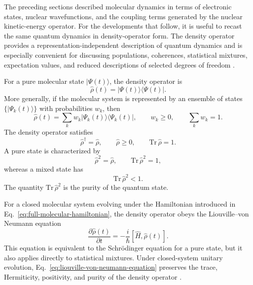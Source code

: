 \documentclass[
  11pt,
  letterpaper,
  onehalfspacing,
  normalmargins,
  equalmargins,
  oneside
]{ut-thesis}
\begin{document}
The preceding sections described molecular dynamics in terms of electronic
states, nuclear wavefunctions, and the coupling terms generated by the nuclear
kinetic-energy operator. For the developments that follow, it is useful to
recast the same quantum dynamics in density-operator form. The density operator
provides a representation-independent description of quantum dynamics and is
especially convenient for discussing populations, coherences, statistical
mixtures, expectation values, and reduced descriptions of selected degrees of
freedom \cite{vonNeumann1955,Blum2012}.

For a pure molecular state \(|\Psi(t)\rangle\), the density operator is
\begin{equation}
\hat\rho(t)
=
|\Psi(t)\rangle\langle\Psi(t)|.
\label{eq:pure-state-density-operator}
\end{equation}
More generally, if the molecular system is represented by an ensemble of states
\(\{|\Psi_k(t)\rangle\}\) with probabilities \(w_k\), then
\begin{equation}
\hat\rho(t)
=
\sum_k
w_k
|\Psi_k(t)\rangle\langle\Psi_k(t)|,
\qquad
w_k\geq 0,
\qquad
\sum_k w_k=1 .
\label{eq:mixed-state-density-operator}
\end{equation}
The density operator satisfies
\begin{equation}
\hat\rho^\dagger=\hat\rho,
\qquad
\hat\rho\geq 0,
\qquad
\mathrm{Tr}\,\hat\rho=1.
\label{eq:density-operator-basic-properties}
\end{equation}
A pure state is characterized by
\begin{equation}
\hat\rho^2=\hat\rho,
\qquad
\mathrm{Tr}\,\hat\rho^2=1,
\label{eq:pure-state-density-properties}
\end{equation}
whereas a mixed state has
\begin{equation}
\mathrm{Tr}\,\hat\rho^2<1.
\label{eq:mixed-state-purity}
\end{equation}
The quantity \(\mathrm{Tr}\,\hat\rho^2\) is the purity of the quantum state.

For a closed molecular system evolving under the Hamiltonian introduced in
Eq.~\eqref{eq:full-molecular-hamiltonian}, the density operator obeys the
Liouville--von Neumann equation
\begin{equation}
\frac{\partial \hat\rho(t)}{\partial t}
=
-\frac{i}{\hbar}
\left[
\hat H,\hat\rho(t)
\right].
\label{eq:liouville-von-neumann-equation}
\end{equation}
This equation is equivalent to the Schr\"odinger equation for a pure state,
but it also applies directly to statistical mixtures. Under closed-system
unitary evolution, Eq.~\eqref{eq:liouville-von-neumann-equation} preserves the
trace, Hermiticity, positivity, and purity of the density operator
\cite{vonNeumann1955,Blum2012}.
\end{document}
